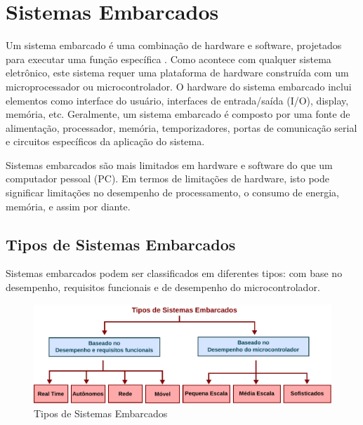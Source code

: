 \section{Sistemas Embarcados}

Um sistema embarcado é uma combinação de hardware e software, projetados
para executar uma função específica \cite{Noergaar2005}. Como acontece
com qualquer sistema eletrônico, este sistema requer uma plataforma
de hardware construída com um microprocessador ou microcontrolador.
O hardware do sistema embarcado inclui elementos como interface do
usuário, interfaces de entrada/saída (I/O), display, memória, etc.
Geralmente, um sistema embarcado é composto por uma fonte de alimentação,
processador, memória, temporizadores, portas de comunicação serial
e circuitos específicos da aplicação do sistema.

Sistemas embarcados são mais limitados em hardware e software do que
um computador pessoal (PC). Em termos de limitações de hardware, isto
pode significar limitações no desempenho de processamento, o consumo
de energia, memória, e assim por diante\cite{Noergaar2005}.

\subsection{Tipos de Sistemas Embarcados}

Sistemas embarcados podem ser classificados em diferentes tipos: com
base no desempenho, requisitos funcionais e de desempenho do microcontrolador.

\begin{figure}[h]
\begin{centering}
\includegraphics[width=1\linewidth]{Imagens/Cap_2/embedded-systems-types}
\par\end{centering}
\caption{Tipos de Sistemas Embarcados \cite{url-efxkits} \label{fig:embedded-systems-types}}
\end{figure}

